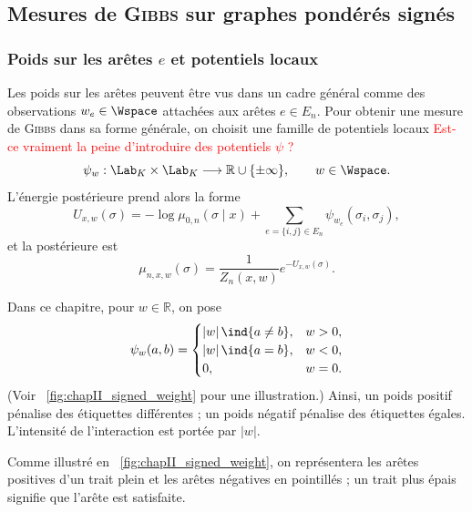 \subsection{Mesures de \textsc{Gibbs} sur graphes pondérés signés}
\label{sec:chapII_gibbs_poids}

\subsubsection{Poids sur les arêtes $e$ et potentiels locaux}

Les poids sur les arêtes peuvent être vus dans un cadre général comme des observations $w_e\in\Wspace$ attachées aux arêtes $e\in E_n$. Pour obtenir une mesure de \textsc{Gibbs} \cite{EdwardsSokal} dans sa forme générale, on choisit une famille de potentiels locaux \cite{EdwardsSokal}
\textcolor{red}{Est-ce vraiment la peine d'introduire des potentiels $\psi$ ?}
\[
    \psi_w:\Lab_K\times\Lab_K\longrightarrow\mathbb R\cup\{\pm\infty\},
    \qquad w\in\Wspace.
\]
L'énergie postérieure prend alors la forme
\begin{equation}
    U_{x,w}(\sigma)
    =
    -\log\mu_{0,n}(\sigma\mid x)
    +
    \sum_{e=\{i,j\}\in E_n}\psi_{w_e}(\sigma_i,\sigma_j),
    \label{eq:chapII_energy_general_weights}
\end{equation}
et la postérieure est
\begin{equation}
    \mu_{n,x,w}(\sigma)=\frac1{Z_n(x,w)}e^{-U_{x,w}(\sigma)}.
    \label{eq:chapII_gibbs_general_weights}
\end{equation}

Dans ce chapitre, pour $w\in\mathbb R$, on pose
\begin{equation}
    \psi_w(a,b)
    =
    \begin{cases}
        |w|\,\ind{a\neq b},& w>0,\\
        |w|\,\ind{a=b},& w<0,\\
        0,& w=0.
    \end{cases}
    \label{eq:chapII_signed_potential}
\end{equation}
(Voir \Fig~\ref{fig:chapII_signed_weight} pour une illustration.)
Ainsi, un poids positif pénalise des étiquettes différentes ; un poids négatif pénalise des étiquettes égales. L'intensité de l'interaction est portée par $|w|$. 

Comme illustré en \Fig~\ref{fig:chapII_signed_weight}, on représentera les arêtes positives d'un trait plein et les arêtes négatives en pointillés ; un trait plus épais signifie que l'arête est satisfaite.


